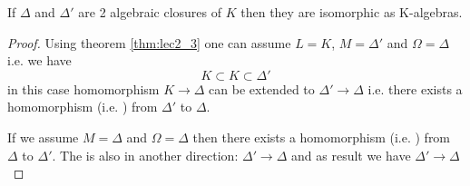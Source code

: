 \begin{corollary}
  If $\Delta$ and $\Delta'$ are 2 algebraic closures of $K$ then they
  are isomorphic as K-algebras.
  \label{col:algebraic_closure_isomorphism}
  \begin{proof}
    Using theorem \ref{thm:lec2_3} one can assume
    $L = K$, $M = \Delta'$ and $\Omega = \Delta$ i.e. we have
    \[
    K \subset K \subset \Delta'
    \]
    in this case homomorphism $K \to \Delta$ can be extended to
    $\Delta' \to \Delta$ i.e. there exists a homomorphism
    (i.e. ) from $\Delta'$ to $\Delta$.

    If we assume $M = \Delta$ and $\Omega = \Delta$ then there exists
    a homomorphism (i.e. ) from $\Delta$ to
    $\Delta'$. The  is also
     in another direction: $\Delta' \to
    \Delta$ and as result we have  $\Delta' \to
    \Delta$ 
  \end{proof}
\end{corollary}
